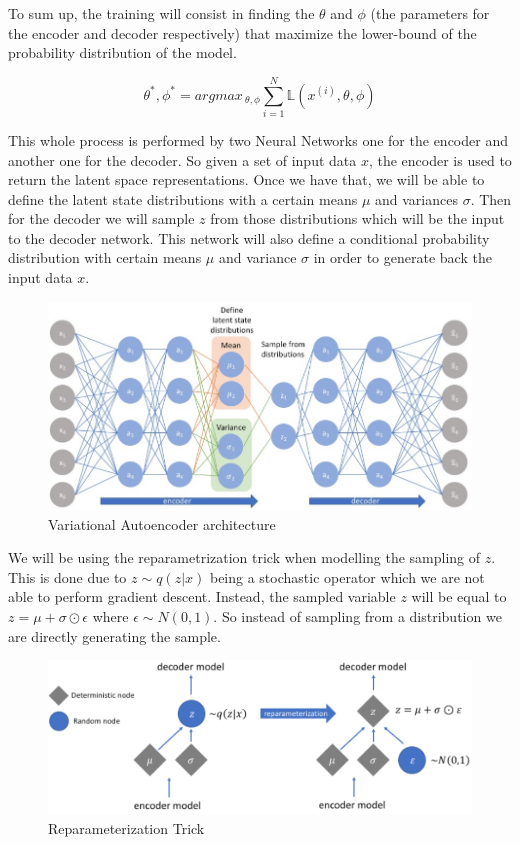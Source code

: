 \noindent To sum up, the training will consist in finding the $\theta$ and $\phi$ (the parameters for the encoder and decoder respectively) that maximize the lower-bound of the probability distribution of the model.

$$ \theta^*, \phi^* = argmax_{~\theta, \phi} \sum_{i=1}^{N} \mathbb{L} (x^{(i)}, \theta, \phi) $$

\newpage
\noindent This whole process is performed by two Neural Networks one for the encoder and another one for the decoder. So given a set of input data $x$, the encoder is used to return the latent space representations. Once we have that, we will be able to define the latent state distributions with a certain means $\mu$ and variances $\sigma$. Then for the decoder we will sample $z$ from those distributions which will be the input to the decoder network. This network will also define a conditional probability distribution with certain means $\mu$ and variance $\sigma$ in order to generate back the input data $x$.

\begin{figure}[h]
    \centering
    \includegraphics[width=13cm]{Images/vae-architecture.png}
    \caption{Variational Autoencoder architecture}
\end{figure}

\noindent We will be using the reparametrization trick when modelling the sampling of $z$. This is done due to $z \sim q(z | x)$ being a stochastic operator which we are not able to perform gradient descent. Instead, the sampled variable $z$ will be equal to $z = \mu + \sigma \odot \epsilon$ where $\epsilon \sim N(0, 1)$. So instead of sampling from a distribution we are directly generating the sample. 

\begin{figure}[h]
    \centering
    \includegraphics[width=12cm]{Images/reparameterization.png}
    \caption{Reparameterization Trick}
\end{figure}

